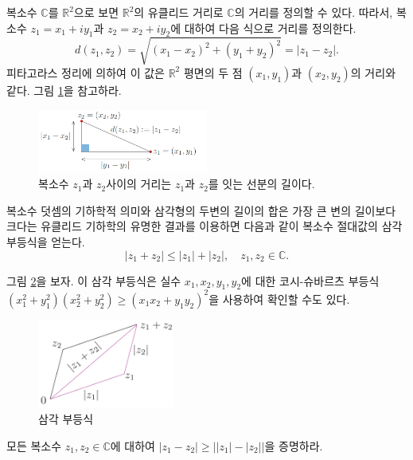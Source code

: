 복소수 $\mathbb C$를 $\mathbb R^2$으로 보면 $\mathbb R^2$의 유클리드 거리로
$\mathbb C$의 거리를 정의할 수 있다.
따라서, 복소수 $z_1=x_1+iy_1$과 $z_2=x_2+iy_2$에 대하여 
다음 식으로 거리를 정의한다.
$$
d(z_1,z_2) = \sqrt{(x_1-x_2)^2 + (y_1+y_2)^2} = |z_1-z_2|.
$$
피타고라스 정리에 의하여 이 값은 $\mathbb R^2$ 평면의 두 점 $(x_1, y_1)$과 $(x_2, y_2)$의 거리와 같다.
그림 \ref{fig-1-10}을 참고하라.

\begin{figure}[!h]
\begin{center}
\includegraphics[width=0.5\textwidth]{./SaltChapter/figs/fig-1-10}
\end{center}
\caption{복소수 $z_1$과 $z_2$사이의 거리는 $z_1$과 $z_2$를 잇는 선분의 길이다.}
\label{fig-1-10}
\end{figure}

복소수 덧셈의 기하학적 의미와 
삼각형의 두변의 길이의 합은 가장 큰 변의 길이보다 크다는 
유클리드 기하학의 유명한 결과를 이용하면
다음과 같이 복소수 절대값의 삼각 부등식을 얻는다.
$$
|z_1+z_2| \le |z_1|  + |z_2|, \quad z_1, z_2\in\mathbb C.
$$

그림 \ref{fig-1-11}을 보자.
이 삼각 부등식은 실수 $x_1, x_2, y_1, y_2$에 대한 코시-슈바르츠 부등식
$(x_1^2+y_1^2) (x_2^2+y_2^2) \ge (x_1x_2 + y_1y_2)^2$을 사용하여
확인할 수도 있다.


\begin{figure}[!h]
\begin{center}
\includegraphics[width=0.4\textwidth]{./SaltChapter/figs/fig-1-11}
\end{center}
\caption{삼각 부등식}
\label{fig-1-11}
\end{figure}

\begin{salt_exercise} \label{ex-1-22}
모든 복소수 $z_1, z_2\in \mathbb C$에 대하여
$|z_1-z_2| \ge \big| |z_1| - |z_2| \big|$을 증명하라.
\end{salt_exercise}

